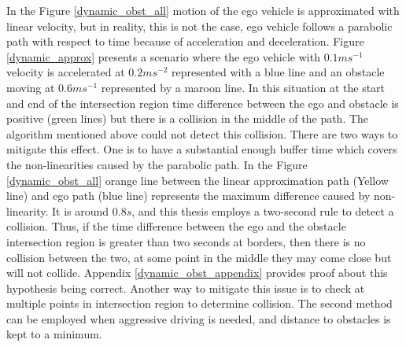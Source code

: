 In the Figure \ref{dynamic_obst_all} motion of the ego vehicle is approximated with linear velocity, but in reality, this is not the case, ego vehicle follows a parabolic path with respect to time because of acceleration and deceleration. Figure \ref{dynamic_approx} presents a scenario where the ego vehicle with $0.1ms^{-1}$ velocity is accelerated at $0.2ms^{-2}$ represented with a blue line and an obstacle moving at $0.6ms^{-1}$ represented by a maroon line. In this situation at the start and end of the intersection region time difference between the ego and obstacle is positive (green lines) but there is a collision in the middle of the path. The algorithm mentioned above could not detect this collision. There are two ways to mitigate this effect. One is to have a substantial enough buffer time which covers the non-linearities caused by the parabolic path. In the Figure \ref{dynamic_obst_all} orange line between the linear approximation path (Yellow line) and ego path (blue line) represents the maximum difference caused by non-linearity. It is around $0.8s$, and this thesis employs a two-second rule to detect a collision. Thus, if the time difference between the ego and the obstacle intersection region is greater than two seconds at borders, then there is no collision between the two, at some point in the middle they may come close but will not collide. Appendix \ref{dynamic_obst_appendix} provides proof about this hypothesis being correct. Another way to mitigate this issue is to check at multiple points in intersection region to determine collision. The second method can be employed when aggressive driving is needed, and distance to obstacles is kept to a minimum.


